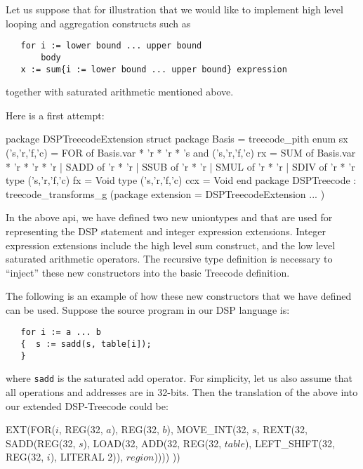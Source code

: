 Let us suppose that for illustration that we would like to
implement high level looping and aggregation constructs such as
\begin{verbatim}
   for i := lower bound ... upper bound
       body
   x := sum{i := lower bound ... upper bound} expression
\end{verbatim}
together with saturated arithmetic mentioned above.

Here is a first attempt:
\begin{SML}
package DSPTreecodeExtension
struct
   package Basis = treecode_pith
   enum sx ('s,'r,'f,'c) = 
      FOR of Basis.var * 'r * 'r * 's
   and ('s,'r,'f,'c) rx = 
      SUM of Basis.var * 'r * 'r * 'r
    | SADD of 'r * 'r
    | SSUB of 'r * 'r
    | SMUL of 'r * 'r
    | SDIV of 'r * 'r
   type ('s,'r,'f,'c) fx = Void
   type ('s,'r,'f,'c) ccx = Void
end
package DSPTreecode : treecode_transforms_g
    (package extension = DSPTreecodeExtension
     ...
    )
\end{SML}
In the above api, we have defined two new uniontypes 
and  that are used for representing the DSP statement
and integer expression extensions.  Integer expression extensions
include the high level sum construct, and the low level saturated
arithmetic operators.  The recursive type definition is
necessary to ``inject'' these new constructors into the basic Treecode 
definition.

The following is an example of how these new constructors that we have defined can be used.  Suppose the source program in our DSP language is:
\begin{verbatim}
   for i := a ... b
   {  s := sadd(s, table[i]);
   }
\end{verbatim}
\noindent where \verb|sadd| is the saturated add operator.
For simplicity, let us also assume that all operations and addresses
are in 32-bits.
Then the translation of the above into our extended DSP-Treecode could be:
\begin{SML}
   EXT(FOR(\(i\), REG(32, \(a\)), REG(32, \(b\)),
           MOVE_INT(32, \(s\), REXT(32, SADD(REG(32, \(s\)), 
                LOAD(32, 
                    ADD(32, REG(32, \(table\)), 
                        LEFT_SHIFT(32, REG(32, \(i\)), LITERAL 2)),
                         \(region\)))))
          ))
\end{SML}

